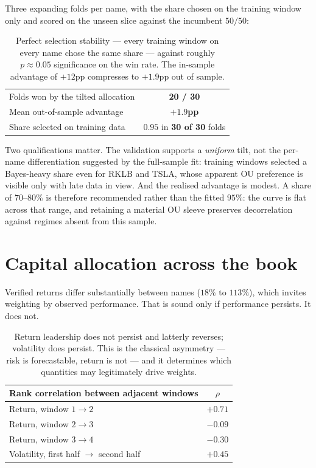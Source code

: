 \documentclass[11pt]{article}
\begin{document}
Three expanding folds per name, with the share chosen on the training window only and scored on
the unseen slice against the incumbent $50/50$:

\begin{table}[H]\centering\small
\renewcommand{\arraystretch}{1.15}
\begin{tabular}{lc}
\toprule
Folds won by the tilted allocation & \textbf{20 / 30}\\
Mean out-of-sample advantage & \textbf{$+1.9$pp}\\
Share selected on training data & $0.95$ in \textbf{30 of 30} folds\\
\bottomrule
\end{tabular}
\caption*{\footnotesize Perfect selection stability --- every training window on every name chose
the same share --- against roughly $p\approx0.05$ significance on the win rate. The in-sample
advantage of $+12$pp compresses to $+1.9$pp out of sample.}
\end{table}

Two qualifications matter. The validation supports a \emph{uniform} tilt, not the per-name
differentiation suggested by the full-sample fit: training windows selected a Bayes-heavy share
even for RKLB and TSLA, whose apparent OU preference is visible only with late data in view.
And the realised advantage is modest. A share of $70\text{--}80\%$ is therefore recommended
rather than the fitted $95\%$: the curve is flat across that range, and retaining a material OU
sleeve preserves decorrelation against regimes absent from this sample.

\section{Capital allocation across the book}

Verified returns differ substantially between names ($18\%$ to $113\%$), which invites weighting
by observed performance. That is sound only if performance persists. It does not.

\begin{table}[H]\centering\small
\renewcommand{\arraystretch}{1.15}
\begin{tabular}{lc}
\toprule
\textbf{Rank correlation between adjacent windows} & \textbf{$\rho$}\\
\midrule
Return, window $1\rightarrow2$ & $+0.71$\\
Return, window $2\rightarrow3$ & $-0.09$\\
Return, window $3\rightarrow4$ & $-0.30$\\
\midrule
\rowcolor{bckeep} Volatility, first half $\rightarrow$ second half & $\mathbf{+0.45}$\\
\bottomrule
\end{tabular}
\caption*{\footnotesize Return leadership does not persist and latterly reverses; volatility
does persist. This is the classical asymmetry --- risk is forecastable, return is not --- and it
determines which quantities may legitimately drive weights.}
\end{table}
\end{document}
